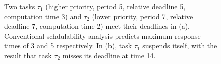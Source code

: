 \begin{figure}[t]
{{}}
\caption{
Two tasks $\tau_1$ (higher priority, period 5, relative deadline 5, computation time 3) and $\tau_2$ (lower priority, period 7, relative deadline 7, computation time 2) meet their deadlines in (a). Conventional schdulability analysis predicts maximum response times of 3 and 5 respectively. In (b), task $\tau_1$ suspends itself, with the result that task $\tau_2$ misses its deadline at time 14.}
\label{fig:ss-intuition}
\end{figure}







